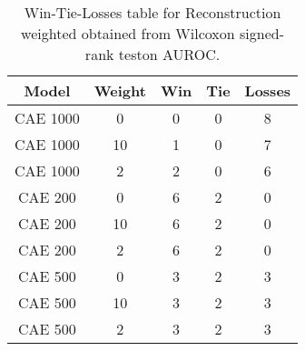 \begin{table}[H]
\centering
\begin{tabular}{|c|c|c|c|c|}

\textbf{Model} & \textbf{Weight} &  \textbf{Win} &  \textbf{Tie} &  \textbf{Losses} \\
\hline

      CAE 1000 &               0 &             0 &             0 &                8 \\
\hline
      CAE 1000 &              10 &             1 &             0 &                7 \\
\hline
      CAE 1000 &               2 &             2 &             0 &                6 \\
\hline
       CAE 200 &               0 &             6 &             2 &                0 \\
\hline
       CAE 200 &              10 &             6 &             2 &                0 \\
\hline
       CAE 200 &               2 &             6 &             2 &                0 \\
\hline
       CAE 500 &               0 &             3 &             2 &                3 \\
\hline
       CAE 500 &              10 &             3 &             2 &                3 \\
\hline
       CAE 500 &               2 &             3 &             2 &                3 \\
\hline

\end{tabular}
\caption{Win-Tie-Losses table for Reconstruction weighted obtained from Wilcoxon signed-rank teston AUROC.}
\label{tab:reconstruction_weighted_weighted_comparison_all}
\end{table}